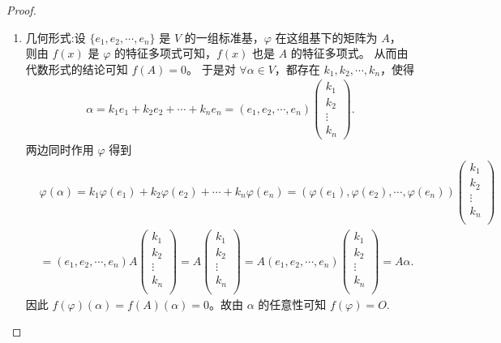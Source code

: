\documentclass[../../main.tex]{subfiles}%
\begin{document}
\begin{proof}
\begin{enumerate}
\item {\heiti 几何形式:}设 $\{ e_1,e_2,\cdots ,e_n \}$ 是 $V$ 的一组标准基，$\varphi$ 在这组基下的矩阵为 $A$，  
则由 $f(x)$ 是 $\varphi$ 的特征多项式可知，$f(x)$ 也是 $A$ 的特征多项式。  
从而由代数形式的结论可知 $f(A) = 0$。  
于是对 $\forall \alpha \in V$，都存在 $k_1,k_2,\cdots ,k_n$，使得  
\begin{align*}
\alpha = k_1e_1+k_2e_2+\cdots +k_ne_n 
= \left( e_1,e_2,\cdots ,e_n \right) \begin{pmatrix}
k_1\\
k_2\\
\vdots\\
k_n
\end{pmatrix}.
\end{align*}
两边同时作用 $\varphi$ 得到  
\begin{align*}
&\varphi \left( \alpha \right) =k_1\varphi \left( e_1 \right) +k_2\varphi \left( e_2 \right) +\cdots +k_n\varphi \left( e_n \right) =\left( \varphi \left( e_1 \right) ,\varphi \left( e_2 \right) ,\cdots ,\varphi \left( e_n \right) \right) \left( \begin{array}{c}
k_1\\
k_2\\
\vdots\\
k_n\\
\end{array} \right) 
\\
&=\left( e_1,e_2,\cdots ,e_n \right) A\left( \begin{array}{c}
k_1\\
k_2\\
\vdots\\
k_n\\
\end{array} \right) =A\left( \begin{array}{c}
k_1\\
k_2\\
\vdots\\
k_n\\
\end{array} \right) =A\left( e_1,e_2,\cdots ,e_n \right) \left( \begin{array}{c}
k_1\\
k_2\\
\vdots\\
k_n\\
\end{array} \right) =A\alpha .
\end{align*}
因此 $f(\varphi)(\alpha) = f(A)(\alpha) = 0$。故由 $\alpha$ 的任意性可知 $f(\varphi) = O$.
\end{enumerate}
\end{proof}
\end{document}
